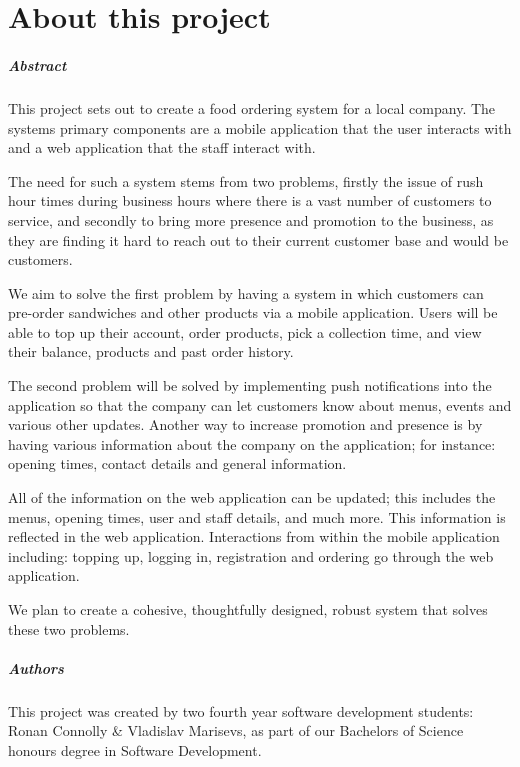 
\chapter*{About this project}
\paragraph{Abstract}

This project sets out to create a food ordering system for a local company. 
The systems primary components are a mobile application that the user interacts with and a web application that the staff interact with.

The need for such a system stems from two problems, firstly the issue of rush hour times during business hours where there is a vast number of customers to service, and secondly to bring more presence and promotion to the business, as they are finding it hard to reach out to their current customer base and would be customers.

We aim to solve the first problem by having a system in which customers can pre-order sandwiches and other products via a mobile application.
Users will be able to top up their account, order products, pick a collection time, and view their balance, products and past order history.

The second problem will be solved by implementing push notifications into the application so that the company can let customers know about menus, events and various other updates. Another way to increase promotion and presence is by having various information about the company on the application; for instance: opening times, contact details and general information. 

All of the information on the web application can be updated; this includes the menus, opening times, user and staff details, and much more. 
This information is reflected in the web application.
Interactions from within the mobile application including: topping up, logging in, registration and ordering go through the web application.

We plan to create a cohesive, thoughtfully designed, robust system that solves these two problems.
\pagebreak

\paragraph{Authors}
This project was created by two fourth year software development students: Ronan Connolly \& Vladislav Marisevs, as part of our Bachelors of Science honours degree in Software Development. 
\linebreak

